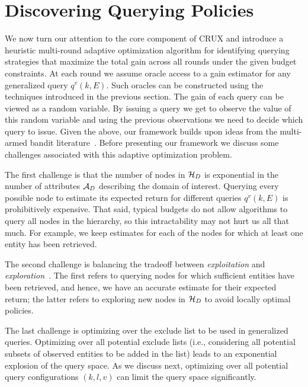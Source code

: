 

\section{Discovering Querying Policies}
\label{sec:solving}
We now turn our attention to the core component of CRUX and introduce a heuristic multi-round adaptive optimization algorithm for identifying querying strategies that maximize the total gain across all rounds under the given budget constraints. At each round we assume oracle access to a gain estimator for any generalized query $q^v(k,E)$. Such oracles can be constructed using the techniques introduced in the previous section. The gain of each query can be viewed as a random variable. By issuing a query we get to observe the value of this random variable and using the previous observations we need to decide which query to issue. Given the above, our framework builds upon ideas from the multi-armed bandit literature~\cite{Auer:2003,EvenDar06actionelimination}. Before presenting our framework we discuss some challenges associated with this adaptive optimization problem.

\squishlist
\item The first challenge is that the number of nodes in $\mathcal{H}_D$ is exponential in the number of attributes $\mathcal{A}_D$ describing the domain of interest. Querying every possible node to estimate its expected return for different queries $q^v(k,E)$ is prohibitively expensive. That said, typical budgets do not allow algorithms to query all nodes in the hierarchy, so this intractability may not hurt us all that much. For example, we keep estimates for each of the nodes for which at least one entity has been retrieved.
\item The second challenge is balancing the tradeoff between {\em exploitation} and {\em exploration}~\cite{Auer:2003}. The first refers to querying nodes for which sufficient entities have been retrieved, and hence, we have an accurate estimate for their expected return; the latter refers to exploring new nodes in $\mathcal{H}_D$ to avoid locally optimal policies.
\item The last challenge is optimizing over the exclude list to be used in generalized queries. Optimizing over all potential exclude lists (i.e., considering all potential subsets of observed entities to be added in the list) leads to an exponential explosion of the query space. As we discuss next, optimizing over all potential query configurations $(k,l,v)$ can limit the query space significantly.
\squishend

